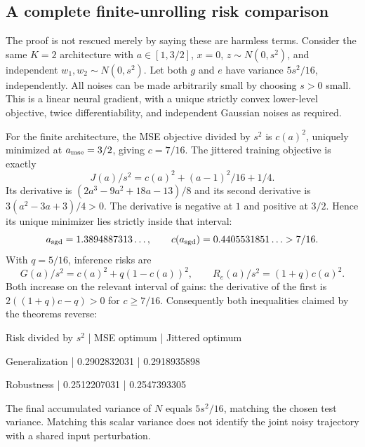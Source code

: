 \documentclass[10pt]{article}
\begin{document}
\subsection*{A complete finite-unrolling risk comparison}
The proof is not rescued merely by saying these are harmless terms. Consider the same \(K=2\) architecture with \(a\in[1,3/2]\), \(x=0\), \(z\sim N(0,s^2)\), and independent \(w_1,w_2\sim N(0,s^2)\). Let both \(g\) and \(e\) have variance \(5s^2/16\), independently. All noises can be made arbitrarily small by choosing \(s>0\) small. This is a linear neural gradient, with a unique strictly convex lower-level objective, twice differentiability, and independent Gaussian noises as required.\par
For the finite architecture, the MSE objective divided by \(s^2\) is \(c(a)^2\), uniquely minimized at \(a_{\rm mse}=3/2\), giving \(c=7/16\). The jittered training objective is exactly \[J(a)/s^2=c(a)^2+(a-1)^2/16+1/4.\] Its derivative is \((2a^3-9a^2+18a-13)/8\) and its second derivative is \(3(a^2-3a+3)/4>0\). The derivative is negative at \(1\) and positive at \(3/2\). Hence its unique minimizer lies strictly inside that interval: \[a_{\rm sgd}=1.3894887313\ldots,\qquad c(a_{\rm sgd})=0.4405531851\ldots>7/16.\] With \(q=5/16\), inference risks are \[G(a)/s^2=c(a)^2+q(1-c(a))^2,\qquad R_e(a)/s^2=(1+q)c(a)^2.\] Both increase on the relevant interval of gains: the derivative of the first is \(2((1+q)c-q)>0\) for \(c\ge7/16\). Consequently both inequalities claimed by the theorems reverse:\par
Risk divided by \(s^2\) | MSE optimum | Jittered optimum\par
Generalization | 0.2902832031 | 0.2918935898\par
Robustness | 0.2512207031 | 0.2547393305\par
The final accumulated variance of \(N\) equals \(5s^2/16\), matching the chosen test variance. Matching this scalar variance does not identify the joint noisy trajectory with a shared input perturbation.\par
\end{document}
